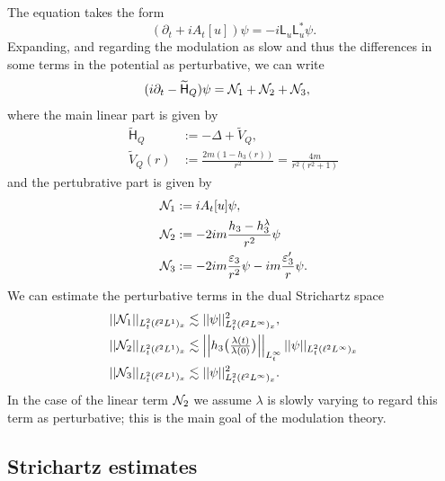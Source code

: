 The equation takes the form  
\begin{equation}
    (\partial_t + i A_t[u]) \psi 
        = -i \mathsf L_u \mathsf L^*_u \psi. 
\end{equation}
Expanding, and regarding the modulation as slow and thus the differences in some terms in the potential as perturbative, we can write 
\begin{equation}\label{eq:hasimotoS}
    \begin{split}
        (i \partial_t - \widetilde{\mathsf H}_Q) \psi 
            &= \mathcal N_1 + \mathcal N_2 + \mathcal N_3,
    \end{split}
    \end{equation}
where the main linear part is given by 
\begin{align*}
    \widetilde{\mathsf H}_Q 
        &:= - \Delta + \widetilde{V}_Q,\\
    \widetilde{V}_Q (r)
        &:= \frac{2m(1 - h_3(r))}{r^2} = \frac{4m}{r^2 (r^2 + 1)}
\end{align*}
and the pertubrative part is given by 
\begin{align*}
        \mathcal N_1 
            &:=  i A_t[u] \psi,\\
        \mathcal N_2
            &:= - 2i m \frac{h_3 - h_3^\lambda }{r^2} \psi \\
        \mathcal N_3 
            &:= - 2i m \frac{\varepsilon_3}{r^2} \psi - i m \frac{\varepsilon_3'}{r}\psi.
    \end{align*}
We can estimate the perturbative terms in the dual Strichartz space 
    \begin{align}
        ||\mathcal N_1||_{L^2_t (\ell^2 L^1)_x}
            &\lesssim  ||\psi||_{L^2_t (\ell^2 L^\infty)_x}^2,\\
        ||\mathcal N_2||_{L^2_t (\ell^2 L^1)_x}
            &\lesssim \left|\left|h_3 \big(\tfrac{\lambda(t)}{\lambda(0)}\big)\right|\right|_{L^\infty_t}  ||\psi||_{L^2_t (\ell^2 L^\infty)_x}\\
            ||\mathcal N_3||_{L^2_t (\ell^2 L^1)_x}
            &\lesssim ||\psi||_{L^2_t (\ell^2 L^\infty)_x}^2.
    \end{align}
In the case of the linear term $\mathcal N_2$ we assume $\lambda$ is slowly varying to regard this term as perturbative; this is the main goal of the modulation theory. 

\subsection{Strichartz estimates}


